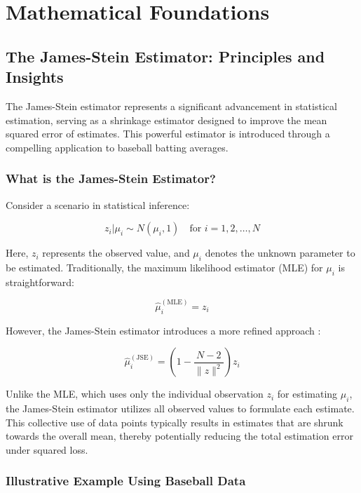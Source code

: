 \section{Mathematical Foundations}

\subsection{The James-Stein Estimator: Principles and Insights}

The James-Stein estimator represents a significant advancement in statistical estimation, serving as a shrinkage estimator designed to improve the mean squared error of estimates. This powerful estimator is introduced through a compelling application to baseball batting averages.

\subsubsection{What is the James-Stein Estimator?}

Consider a scenario in statistical inference:

\begin{equation}
    z_i | \mu_i \sim N(\mu_i, 1) \quad \text{for } i = 1, 2, \dots, N
\end{equation}

Here, $z_i$ represents the observed value, and $\mu_i$ denotes the unknown parameter to be estimated. Traditionally, the maximum likelihood estimator (MLE) for $\mu_i$ is straightforward:

\begin{equation}
    \hat{\mu}_i^{(\text{MLE})} = z_i
\end{equation}

However, the James-Stein estimator introduces a more refined approach \cite{james1992estimation,efron2021computer}:

\begin{equation}
    \hat{\mu}_i^{(\text{JSE})} = \left(1 - \frac{N-2}{\|z\|^2}\right)z_i
\end{equation}

Unlike the MLE, which uses only the individual observation $z_i$ for estimating $\mu_i$, the James-Stein estimator utilizes all observed values to formulate each estimate. This collective use of data points typically results in estimates that are shrunk towards the overall mean, thereby potentially reducing the total estimation error under squared loss.

\subsubsection{Illustrative Example Using Baseball Data}

